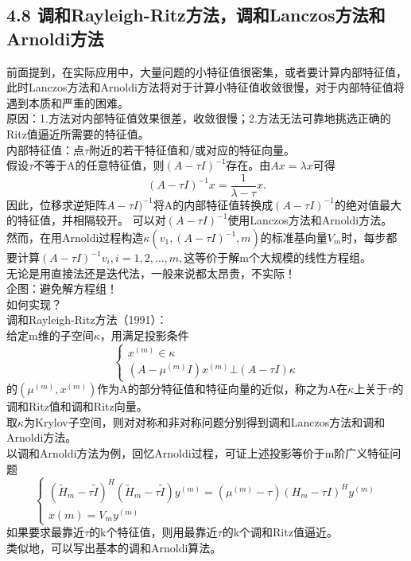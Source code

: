 \documentclass[a4paper,12pt]{article}
\begin{document}
\begin{CJK*}{UTF8}{gbsn}
	\section{4.8 调和Rayleigh-Ritz方法，调和Lanczos方法和Arnoldi方法}
	前面提到，在实际应用中，大量问题的小特征值很密集，或者要计算内部特征值，此时Lanczos方法和Arnoldi方法将对于计算小特征值收敛很慢，对于内部特征值将遇到本质和严重的困难。\\
	原因：1.方法对内部特征值效果很差，收敛很慢；2.方法无法可靠地挑选正确的Ritz值逼近所需要的特征值。\\
	内部特征值：点$\tau$附近的若干特征值和/或对应的特征向量。\\
	假设$\tau$不等于A的任意特征值，则$(A-\tau I)^{-1}$存在。由$Ax=\lambda x$可得
	$$ (A-\tau I)^{-1}x = \frac{1}{\lambda - \tau}x.$$
	因此，位移求逆矩阵$A-\tau I)^{-1}$将A的内部特征值转换成$(A-\tau I)^{-1}$的绝对值最大的特征值，并相隔较开。
	可以对$(A-\tau I)^{-1}$使用Lanczos方法和Arnoldi方法。\\
	然而，在用Arnoldi过程构造$\kappa(v_1,(A-\tau I)^{-1},m)$的标准基向量$V_m$时，每步都要计算$(A-\tau I)^{-1}v_i,i=1,2,\ldots,m,$这等价于解m个大规模的线性方程组。\\
	无论是用直接法还是迭代法，一般来说都太昂贵，不实际！\\
	企图：避免解方程组！\\
	如何实现？\\
	调和Rayleigh-Ritz方法（1991）：\\
	给定m维的子空间$\kappa$，用满足投影条件\\
	$$\begin{cases}
		x^{(m)} \in \kappa \\
		(A-\mu^{(m)}I)x^{(m)} \bot (A-\tau I)\kappa
	\end{cases}$$
	的$(\mu^{(m)},x^{(m)})$作为A的部分特征值和特征向量的近似，称之为A在$\kappa$上关于$\tau$的调和Ritz值和调和Ritz向量。\\
	取$\kappa$为Krylov子空间，则对对称和非对称问题分别得到调和Lanczos方法和调和Arnoldi方法。\\
	以调和Arnoldi方法为例，回忆Arnoldi过程，可证上述投影等价于m阶广义特征问题
	$$\begin{cases}
		(\tilde{H}_m - \tau \tilde{I})^H(\tilde{H}_m - \tau\tilde{I})y^{(m)} = (\mu^{(m)} - \tau)(H_m - \tau I)^Hy^{(m)} \\
		x(m) = V_my^{(m)}
	\end{cases}$$
	如果要求最靠近$\tau$的k个特征值，则用最靠近$\tau$的k个调和Ritz值逼近。\\
	类似地，可以写出基本的调和Arnoldi算法。\\

\end{CJK*}
\end{document}
